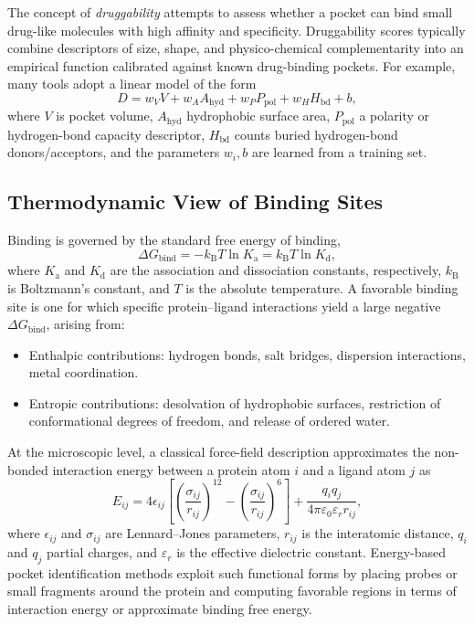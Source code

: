 \documentclass[12pt,a4paper]{article}
\begin{document}
The concept of \emph{druggability} attempts to assess whether a pocket can bind small drug-like molecules with high affinity and specificity. Druggability scores typically combine descriptors of size, shape, and physico-chemical complementarity into an empirical function calibrated against known drug-binding pockets.\cite{CH5_Halgren2009,CH5_LeGuilloux2009} For example, many tools adopt a linear model of the form
\begin{equation}
D = w_V V + w_A A_{\mathrm{hyd}} + w_P P_{\mathrm{pol}} + w_H H_{\mathrm{bd}} + b,
\label{eq:druggability}
\end{equation}
where \(V\) is pocket volume, \(A_{\mathrm{hyd}}\) hydrophobic surface area, \(P_{\mathrm{pol}}\) a polarity or hydrogen-bond capacity descriptor, \(H_{\mathrm{bd}}\) counts buried hydrogen-bond donors/acceptors, and the parameters \(w_i, b\) are learned from a training set.

\subsection{Thermodynamic View of Binding Sites}

Binding is governed by the standard free energy of binding,
\begin{equation}
\Delta G_{\mathrm{bind}} = -k_{\mathrm{B}} T \ln K_{\mathrm{a}} = k_{\mathrm{B}} T \ln K_{\mathrm{d}},
\label{eq:dg_bind}
\end{equation}
where \(K_{\mathrm{a}}\) and \(K_{\mathrm{d}}\) are the association and dissociation constants, respectively, \(k_{\mathrm{B}}\) is Boltzmann's constant, and \(T\) is the absolute temperature. A favorable binding site is one for which specific protein--ligand interactions yield a large negative \(\Delta G_{\mathrm{bind}}\), arising from:
\begin{itemize}
    \item Enthalpic contributions: hydrogen bonds, salt bridges, dispersion interactions, metal coordination.
    \item Entropic contributions: desolvation of hydrophobic surfaces, restriction of conformational degrees of freedom, and release of ordered water.
\end{itemize}

At the microscopic level, a classical force-field description approximates the non-bonded interaction energy between a protein atom \(i\) and a ligand atom \(j\) as
\begin{equation}
E_{ij} = 4\epsilon_{ij} \left[ \left(\frac{\sigma_{ij}}{r_{ij}} \right)^{12} - \left( \frac{\sigma_{ij}}{r_{ij}} \right)^6 \right] + \frac{q_i q_j}{4\pi \varepsilon_0 \varepsilon_r r_{ij}},
\label{eq:lj_coulomb}
\end{equation}
where \(\epsilon_{ij}\) and \(\sigma_{ij}\) are Lennard--Jones parameters, \(r_{ij}\) is the interatomic distance, \(q_i\) and \(q_j\) partial charges, and \(\varepsilon_r\) is the effective dielectric constant. Energy-based pocket identification methods exploit such functional forms by placing probes or small fragments around the protein and computing favorable regions in terms of interaction energy or approximate binding free energy.\cite{CH5_Ngan2012,CH5_Halgren2009}
\end{document}
